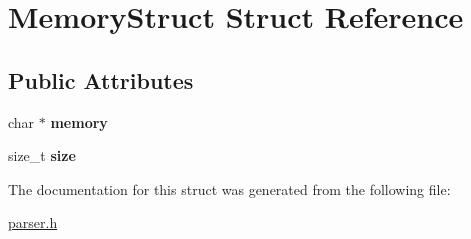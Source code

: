 \hypertarget{struct_memory_struct}{\section{Memory\+Struct Struct Reference}
\label{struct_memory_struct}
}
\subsection*{Public Attributes}
\begin{DoxyCompactItemize}
\item 
\hypertarget{struct_memory_struct_a218a6fde0f367d44400542cbe523e943}{char $\ast$ {\bfseries memory}}\label{struct_memory_struct_a218a6fde0f367d44400542cbe523e943}

\item 
\hypertarget{struct_memory_struct_a79d6a7ad34b172f766c19d0846688440}{size\+\_\+t {\bfseries size}}\label{struct_memory_struct_a79d6a7ad34b172f766c19d0846688440}

\end{DoxyCompactItemize}


The documentation for this struct was generated from the following file\+:\begin{DoxyCompactItemize}
\item 
\hyperlink{parser_8h}{parser.\+h}\end{DoxyCompactItemize}

